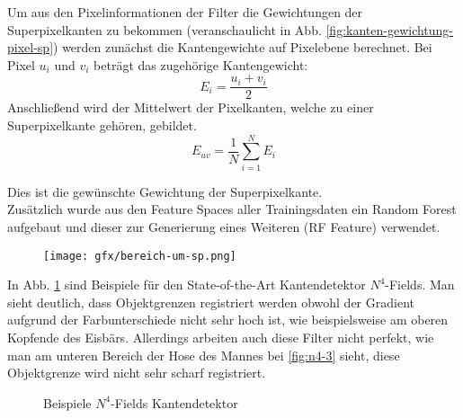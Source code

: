 Um aus den Pixelinformationen der Filter die Gewichtungen der Superpixelkanten zu bekommen (veranschaulicht in Abb. \ref{fig:kanten-gewichtung-pixel-sp}) werden zunächst die Kantengewichte auf Pixelebene berechnet. Bei Pixel $u_i$ und $v_i$ beträgt das zugehörige Kantengewicht:
\begin{equation}
	E_{i}=\frac{u_i+v_i}{2}
\end{equation} 
Anschließend wird der Mittelwert der Pixelkanten, welche zu einer Superpixelkante gehören, gebildet. 
\begin{equation}
E_{uv} = \frac{1}{N} \sum\limits_{i=1}^{N} E_i
\end{equation}

Dies ist die gewünschte Gewichtung der Superpixelkante. \\


Zusätzlich wurde aus den Feature Spaces aller Trainingsdaten ein Random Forest aufgebaut und dieser zur Generierung eines Weiteren (RF Feature) verwendet.

\vspace{1cm}

\begin{figure}[H]
	\centering
	\texttt{[image: gfx/bereich-um-sp.png]}
\end{figure}
\label{fig:var-bereich-sp}
\vspace{0.5cm}

\newpage

In Abb. \ref{fig:n4} sind Beispiele für den State-of-the-Art Kantendetektor $N^4$-Fields. Man sieht deutlich, dass Objektgrenzen registriert werden obwohl der Gradient aufgrund der Farbunterschiede nicht sehr hoch ist, wie beispielsweise am oberen Kopfende des Eisbärs. Allerdings arbeiten auch diese Filter nicht perfekt, wie man am unteren Bereich der Hose des Mannes bei \ref{fig:n4-3} sieht, diese Objektgrenze wird nicht sehr scharf registriert. 


\begin{figure}[H]
	\centering
	\hfill
	
	\hfill
	
	\caption{Beispiele $N^4$-Fields Kantendetektor}
	\label{fig:n4}
\end{figure}

